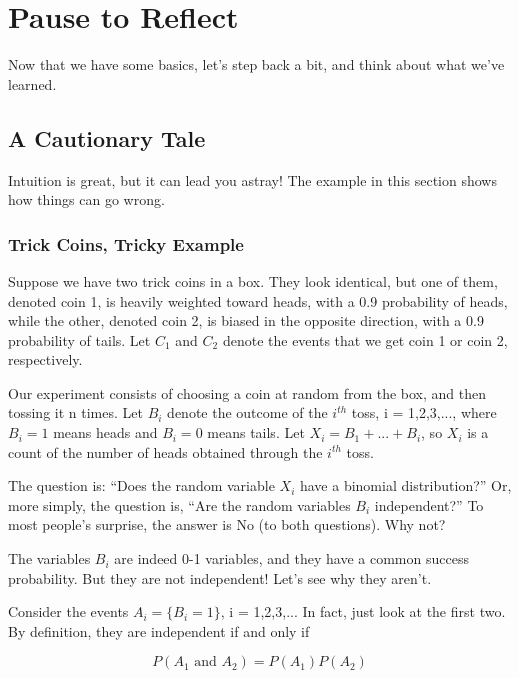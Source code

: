 \chapter{Pause to Reflect}
\label{reflect}

Now that we have some basics, let's step back a bit, and think about
what we've learned.

\section{A Cautionary Tale}
\label{caution}

Intuition is great, but it can lead you astray!  The example in this
section shows how things can go wrong.

\subsection{Trick Coins, Tricky Example}

Suppose we have two trick coins in a box. They look identical, but one
of them, denoted coin 1, is heavily weighted toward heads, with a 0.9
probability of heads, while the other, denoted coin 2, is biased in the
opposite direction, with a 0.9 probability of tails.  Let $C_1$ and
$C_2$ denote the events that we get coin 1 or coin 2, respectively.

Our experiment consists of choosing a coin at random from the box, and
then tossing it n times. Let $B_i$ denote the outcome of the $i^{th}$
toss, i = 1,2,3,..., where $B_i = 1$ means heads and $B_i = 0$ means
tails.  Let $X_i = B_1+...+B_i$, so $X_i$ is a count of the number of
heads obtained through the $i^{th}$ toss.

The question is: ``Does the random variable $X_i$ have a binomial
distribution?''  Or, more simply, the question is, ``Are the random
variables $B_i$ independent?'' To most people's surprise, the answer is
No (to both questions).  Why not?

The variables $B_i$ are indeed 0-1 variables, and they have a common
success probability.  But they are not independent!  Let's see why they
aren't.

Consider the events $A_i = \{B_i=1\}$, i = 1,2,3,...  In fact, just look
at the first two.  By definition, they are independent if and only if 

\begin{equation}
\label{notindep}
P(A_1\textrm{~and~}A_2) = P(A_1)P(A_2)
\end{equation}

